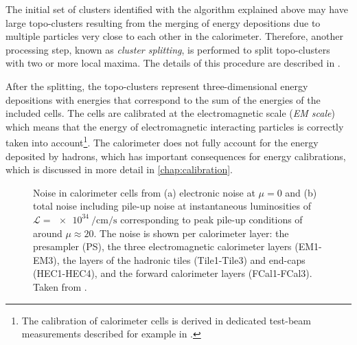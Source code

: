The initial set of clusters identified with the algorithm explained above may have large topo-clusters resulting from the merging of energy depositions due to multiple particles very close to each other in the calorimeter.
Therefore, another processing step, known as \emph{cluster splitting}, is performed to split topo-clusters with two or more local maxima. The details of this procedure are described in .

After the splitting, the topo-clusters represent three-dimensional energy depositions with energies that correspond to the sum of the energies of the included cells.
The cells are calibrated at the electromagnetic scale (\emph{EM scale}) which means that the energy of electromagnetic interacting particles is correctly taken into account\footnote{The calibration of calorimeter cells is derived in dedicated test-beam measurements described for example in .}. The calorimeter does not fully account for the energy deposited by hadrons, which has important consequences for energy calibrations, which is discussed in more detail in \cref{chap:calibration}.

\begin{figure}
        
    \caption{Noise in calorimeter cells from (a) electronic noise at $\mu=0$ and (b) total noise including pile-up noise at instantaneous luminosities of $\mathcal{L} = \SI{e34}{\per\cm\per\s}$ corresponding to peak pile-up conditions of around $\mu\approx20$. The noise is shown per calorimeter layer: the presampler (PS), the three electromagnetic calorimeter layers (EM1-EM3), the layers of the hadronic tiles (Tile1-Tile3) and end-caps (HEC1-HEC4), and the forward calorimeter layers (FCal1-FCal3). Taken from .}
    \label{fig:calo-noise}
\end{figure}



